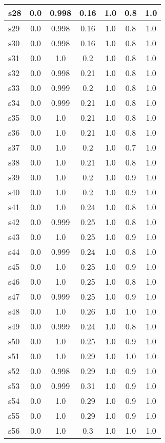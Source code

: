 \documentclass{article}
\begin{document}
\begin{tabular}{|l|c|c|c|c|c|c|}
\hline
s28 &0.0 & 0.998 & 0.16 & 1.0 & 0.8 & 1.0\\
\hline
s29 &0.0 & 0.998 & 0.16 & 1.0 & 0.8 & 1.0\\
\hline
s30 &0.0 & 0.998 & 0.16 & 1.0 & 0.8 & 1.0\\
\hline
s31 &0.0 & 1.0 & 0.2 & 1.0 & 0.8 & 1.0\\
\hline
s32 &0.0 & 0.998 & 0.21 & 1.0 & 0.8 & 1.0\\
\hline
s33 &0.0 & 0.999 & 0.2 & 1.0 & 0.8 & 1.0\\
\hline
s34 &0.0 & 0.999 & 0.21 & 1.0 & 0.8 & 1.0\\
\hline
s35 &0.0 & 1.0 & 0.21 & 1.0 & 0.8 & 1.0\\
\hline
s36 &0.0 & 1.0 & 0.21 & 1.0 & 0.8 & 1.0\\
\hline
s37 &0.0 & 1.0 & 0.2 & 1.0 & 0.7 & 1.0\\
\hline
s38 &0.0 & 1.0 & 0.21 & 1.0 & 0.8 & 1.0\\
\hline
s39 &0.0 & 1.0 & 0.2 & 1.0 & 0.9 & 1.0\\
\hline
s40 &0.0 & 1.0 & 0.2 & 1.0 & 0.9 & 1.0\\
\hline
s41 &0.0 & 1.0 & 0.24 & 1.0 & 0.8 & 1.0\\
\hline
s42 &0.0 & 0.999 & 0.25 & 1.0 & 0.8 & 1.0\\
\hline
s43 &0.0 & 1.0 & 0.25 & 1.0 & 0.9 & 1.0\\
\hline
s44 &0.0 & 0.999 & 0.24 & 1.0 & 0.8 & 1.0\\
\hline
s45 &0.0 & 1.0 & 0.25 & 1.0 & 0.9 & 1.0\\
\hline
s46 &0.0 & 1.0 & 0.25 & 1.0 & 0.8 & 1.0\\
\hline
s47 &0.0 & 0.999 & 0.25 & 1.0 & 0.9 & 1.0\\
\hline
s48 &0.0 & 1.0 & 0.26 & 1.0 & 1.0 & 1.0\\
\hline
s49 &0.0 & 0.999 & 0.24 & 1.0 & 0.8 & 1.0\\
\hline
s50 &0.0 & 1.0 & 0.25 & 1.0 & 0.9 & 1.0\\
\hline
s51 &0.0 & 1.0 & 0.29 & 1.0 & 1.0 & 1.0\\
\hline
s52 &0.0 & 0.998 & 0.29 & 1.0 & 0.9 & 1.0\\
\hline
s53 &0.0 & 0.999 & 0.31 & 1.0 & 0.9 & 1.0\\
\hline
s54 &0.0 & 1.0 & 0.29 & 1.0 & 0.9 & 1.0\\
\hline
s55 &0.0 & 1.0 & 0.29 & 1.0 & 0.9 & 1.0\\
\hline
s56 &0.0 & 1.0 & 0.3 & 1.0 & 1.0 & 1.0\\
\hline

\end{tabular}
\end{document}
